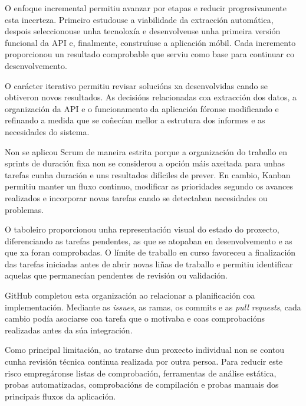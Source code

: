 O enfoque incremental permitiu avanzar por etapas e reducir progresivamente esta incerteza. Primeiro estudouse a viabilidade da extracción automática, despois seleccionouse unha tecnoloxía e desenvolveuse unha primeira versión funcional da API e, finalmente, construíuse a aplicación móbil. Cada incremento proporcionou un resultado comprobable que serviu como base para continuar co desenvolvemento.

O carácter iterativo permitiu revisar solucións xa desenvolvidas cando se obtiveron novos resultados. As decisións relacionadas coa extracción dos datos, a organización da API e o funcionamento da aplicación fóronse modificando e refinando a medida que se coñecían mellor a estrutura dos informes e as necesidades do sistema.

Non se aplicou Scrum de maneira estrita porque a organización do traballo en sprints de duración fixa non se considerou a opción máis axeitada para unhas tarefas cunha duración e uns resultados difíciles de prever. En cambio, Kanban permitiu manter un fluxo continuo, modificar as prioridades segundo os avances realizados e incorporar novas tarefas cando se detectaban necesidades ou problemas.

O taboleiro proporcionou unha representación visual do estado do proxecto, diferenciando as tarefas pendentes, as que se atopaban en desenvolvemento e as que xa foran comprobadas. O límite de traballo en curso favoreceu a finalización das tarefas iniciadas antes de abrir novas liñas de traballo e permitiu identificar aquelas que permanecían pendentes de revisión ou validación.

GitHub completou esta organización ao relacionar a planificación coa implementación. Mediante as \textit{issues}, as ramas, os commits e as \textit{pull requests}, cada cambio podía asociarse coa tarefa que o motivaba e coas comprobacións realizadas antes da súa integración.

Como principal limitación, ao tratarse dun proxecto individual non se contou cunha revisión técnica continua realizada por outra persoa. Para reducir este risco empregáronse listas de comprobación, ferramentas de análise estática, probas automatizadas, comprobacións de compilación e probas manuais dos principais fluxos da aplicación.
